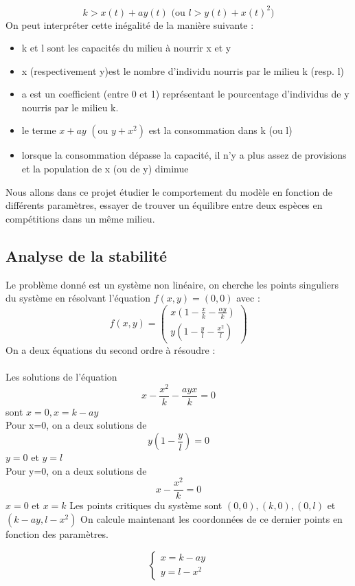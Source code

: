 \documentclass{article}
\begin{document}
\begin{equation}
k > x(t) + ay(t) \text{    (ou } l> y(t) + x(t)^{2}) 
\end{equation}
On peut interpréter cette inégalité de la manière suivante :
\begin{itemize}
    \item k et l sont les capacités du milieu à nourrir x et y
    \item x (respectivement y)est le nombre d'individu nourris par le milieu k (resp. l)
    \item a est un coefficient (entre 0 et 1) représentant le pourcentage d'individus de y nourris par le milieu k.
    \item le terme $x + ay$ $(\text{ou } y+ x^{2})$ est la consommation dans k (ou l)
    \item lorsque la consommation dépasse la capacité, il n'y a plus assez de provisions et la population de x (ou de y) diminue
\end{itemize}
Nous allons dans ce projet étudier le comportement du modèle en fonction de différents paramètres, essayer de trouver un équilibre entre deux espèces en compétitions dans un même milieu.
\subsection{Analyse de la stabilité}
Le problème donné est un système non linéaire, on cherche les points singuliers du système en résolvant l'équation $f(x,y) = (0,0) $ avec :
$$
f(x,y) = 
\begin{pmatrix}
x(1 - \frac{x}{k} - \frac{\alpha y}{k}) \\
 y(1- \frac{y}{l} - \frac{x^{2}}{l})
\end{pmatrix}
$$
On a deux équations du second ordre à résoudre : \\ \\
Les solutions de l'équation \[x - \frac{x^{2}}{k} - \frac{ayx}{k} = 0\] sont  $x = 0, x= k- ay$\\
Pour x=0, on a deux solutions de \[y(1- \frac{y}{l}) = 0\] $y= 0$ et $y = l $  \\
Pour y=0, on a deux solutions de \[x - \frac{x^{2}}{k} = 0\]
$x=0$  et  $x=k$
Les points critiques du système sont $(0,0), (k,0), (0,l)$ et $(k-ay,l-x^{2})$ On calcule maintenant les coordonnées de ce dernier points en fonction des paramètres.


$$
\left\{
\begin{array}{ll}
x = k- ay \\
y = l - x^{2}
\end{array}
\right.
$$
\end{document}
